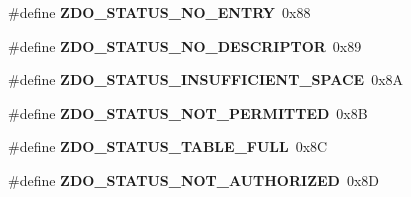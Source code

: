\begin{DoxyCompactItemize}
\item 
\hypertarget{group__zdo_ga1f183b5c7a93f106d28696acb96652d6}{\#define {\bfseries Z\-D\-O\-\_\-\-S\-T\-A\-T\-U\-S\-\_\-\-N\-O\-\_\-\-E\-N\-T\-R\-Y}~0x88}\label{group__zdo_ga1f183b5c7a93f106d28696acb96652d6}

\item 
\hypertarget{group__zdo_ga6e2e64f9a8999b8334de157c6c0cdad1}{\#define {\bfseries Z\-D\-O\-\_\-\-S\-T\-A\-T\-U\-S\-\_\-\-N\-O\-\_\-\-D\-E\-S\-C\-R\-I\-P\-T\-O\-R}~0x89}\label{group__zdo_ga6e2e64f9a8999b8334de157c6c0cdad1}

\item 
\hypertarget{group__zdo_ga8e834faf1232208d667ff946fd9ae1ab}{\#define {\bfseries Z\-D\-O\-\_\-\-S\-T\-A\-T\-U\-S\-\_\-\-I\-N\-S\-U\-F\-F\-I\-C\-I\-E\-N\-T\-\_\-\-S\-P\-A\-C\-E}~0x8\-A}\label{group__zdo_ga8e834faf1232208d667ff946fd9ae1ab}

\item 
\hypertarget{group__zdo_ga74c9f08daf978af42a89f710a3ac0549}{\#define {\bfseries Z\-D\-O\-\_\-\-S\-T\-A\-T\-U\-S\-\_\-\-N\-O\-T\-\_\-\-P\-E\-R\-M\-I\-T\-T\-E\-D}~0x8\-B}\label{group__zdo_ga74c9f08daf978af42a89f710a3ac0549}

\item 
\hypertarget{group__zdo_gab2f02cd6c716a5217aa9671dfc657872}{\#define {\bfseries Z\-D\-O\-\_\-\-S\-T\-A\-T\-U\-S\-\_\-\-T\-A\-B\-L\-E\-\_\-\-F\-U\-L\-L}~0x8\-C}\label{group__zdo_gab2f02cd6c716a5217aa9671dfc657872}

\item 
\hypertarget{group__zdo_gac1b973f9681f4bbf319244d55ca6d2cd}{\#define {\bfseries Z\-D\-O\-\_\-\-S\-T\-A\-T\-U\-S\-\_\-\-N\-O\-T\-\_\-\-A\-U\-T\-H\-O\-R\-I\-Z\-E\-D}~0x8\-D}\label{group__zdo_gac1b973f9681f4bbf319244d55ca6d2cd}

\end{DoxyCompactItemize}
